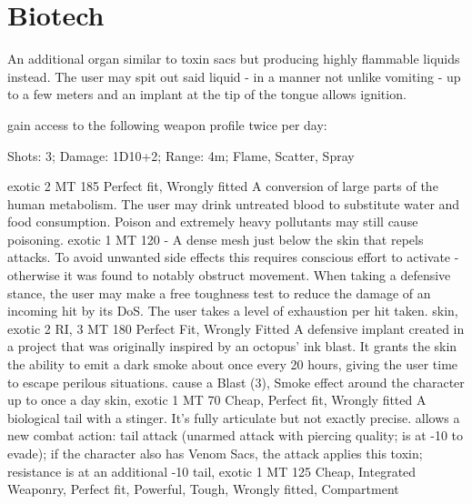 \documentclass[12pt,a4paper,openany,usenames,dvipsnames]{book}
\begin{document}
    \section{Biotech}
        {An additional organ similar to toxin sacs but producing highly flammable liquids instead. The user may spit out said liquid - in a manner not unlike vomiting - up to a few meters and an implant at the tip of the tongue allows ignition.}
        {gain access to the following weapon profile twice per day:
    	\par\hspace*{10mm} Shots: 3; Damage: 1D10+2; Range: 4m; Flame, Scatter, Spray
        }
        {exotic}
        {2 MT}
        {185}
        {Perfect fit, Wrongly fitted}
        {A conversion of large parts of the human metabolism.}
        {The user may drink untreated blood to substitute water and food consumption. Poison and extremely heavy pollutants may still cause poisoning.}
        {exotic}
        {1 MT}
        {120}
        {-}
    	{A dense mesh just below the skin that repels attacks.
    		To avoid unwanted side effects this requires conscious effort to activate
    		- otherwise it was found to notably obstruct movement.}
    	{When taking a defensive stance, the user may make a free toughness test to reduce the damage of an incoming hit by its DoS. The user takes a level of exhaustion per hit taken.}
    	{skin, exotic}
    	{2 RI, 3 MT}
    	{180}
    	{Perfect Fit, Wrongly Fitted}
        {A defensive implant created in a project that was originally inspired by an octopus' ink blast. It grants the skin the ability to emit a dark smoke about once every 20 hours, giving the user time to escape perilous situations.}
        {cause a Blast (3), Smoke effect around the character up to once a day}
        {skin, exotic}
        {1 MT}
        {70}
        {Cheap, Perfect fit, Wrongly fitted}
        {A biological tail with a stinger. It's fully articulate but not exactly precise.}
        {allows a new combat action: tail attack (unarmed attack with piercing quality; is at -10 to evade); if the character also has Venom Sacs, the attack applies this toxin; resistance is at an additional -10}
        {tail, exotic}
        {1 MT}
        {125}
        {Cheap, Integrated Weaponry, Perfect fit, Powerful, Tough, Wrongly fitted, Compartment}
\end{document}
